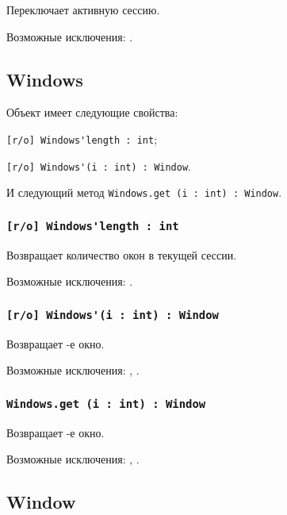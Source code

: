 Переключает активную сессию.

Возможные исключения: .


\subsection{{\color{orange} Windows}}

Объект \windows{} имеет следующие свойства:
\begin{icItems}
	\item \lstinline|[r/o] Windows'length : int|;
	\item \lstinline|[r/o] Windows'(i : int) : Window|.
\end{icItems}

И следующий метод \lstinline|Windows.get (i : int) : Window|.

\subsubsection{\lstinline|[r/o] Windows'length : int|}

Возвращает количество окон в текущей сессии.

Возможные исключения: .

\subsubsection{\lstinline|[r/o] Windows'(i : int) : Window|}

Возвращает -е окно.

Возможные исключения: , .

\subsubsection{\lstinline|Windows.get (i : int) : Window|}

Возвращает -е окно.

Возможные исключения: , .

\subsection{{\color{orange} Window}}

